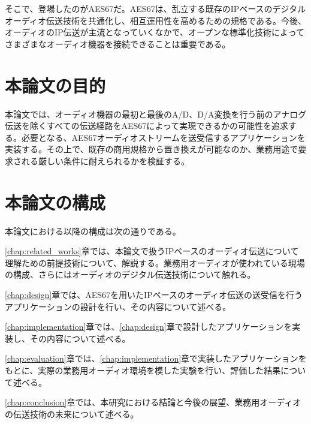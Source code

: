 そこで、登場したのがAES67だ。AES67は、乱立する既存のIPベースのデジタルオーディオ伝送技術を共通化し、相互運用性を高めるための規格である。今後、オーディオのIP伝送が主流となっていくなかで、オープンな標準化技術によってさまざまなオーディオ機器を接続できることは重要である。

\section{本論文の目的}

本論文では、オーディオ機器の最初と最後のA/D、D/A変換を行う前のアナログ伝送を除くすべての伝送経路をAES67によって実現できるかの可能性を追求する。必要となる、AES67オーディオストリームを送受信するアプリケーションを実装する。その上で、既存の商用規格から置き換えが可能なのか、業務用途で要求される厳しい条件に耐えられるかを検証する。

\section{本論文の構成}

本論文における以降の構成は次の通りである。

\ref{chap:related_works}章では、本論文で扱うIPベースのオーディオ伝送について理解ための前提技術について、解説する。業務用オーディオが使われている現場の構成、さらにはオーディオのデジタル伝送技術について触れる。

\ref{chap:design}章では、AES67を用いたIPベースのオーディオ伝送の送受信を行うアプリケーションの設計を行い、その内容について述べる。

\ref{chap:implementation}章では、\ref{chap:design}章で設計したアプリケーションを実装し、その内容について述べる。

\ref{chap:evaluation}章では、\ref{chap:implementation}章で実装したアプリケーションをもとに、実際の業務用オーディオ環境を模した実験を行い、評価した結果について述べる。

\ref{chap:conclusion}章では、本研究における結論と今後の展望、業務用オーディオの伝送技術の未来について述べる。
